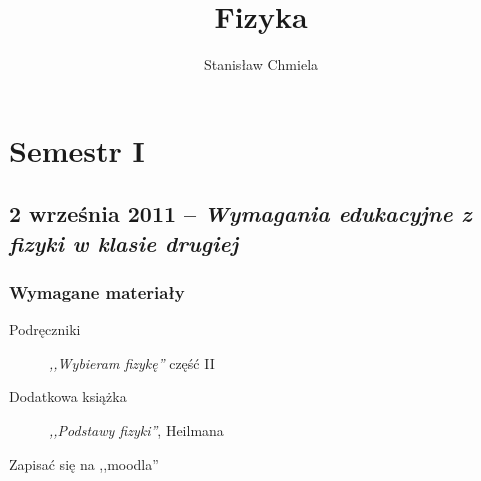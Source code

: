 \documentclass [a4paper, 11pt, oneside]{book}
\author{Stanisław Chmiela}
\title{Fizyka}
\begin{document}
\maketitle
\tableofcontents
\part{Semestr I}
\chapter{2 września 2011 -- \textit{Wymagania edukacyjne z fizyki w klasie drugiej}}
	\section{Wymagane materiały}
		\begin{description}
		\item[Podręczniki] \textit{,,Wybieram fizykę''} część II
		\item[Dodatkowa książka] \textit{,,Podstawy fizyki''}, Heilmana
		\item[Zapisać się na ,,moodla'']
		\end{description}
\end{document}
